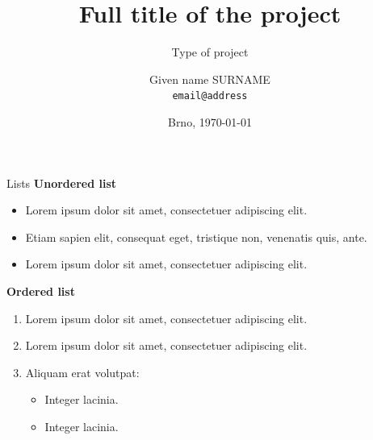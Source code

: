 \documentclass[aspectratio=1610]{beamer}
\title[Short title]
{Full title of the project}
\subtitle
{Type of project}
\author[Given name SURNAME]
{Given name SURNAME\\
\texttt{email@address}}
\institute
{Department of Radio Electronics\\
Brno University of Technology, Czechia}
\date[\today]
{Brno, \today}
\begin{document}

\begin{frame}
    \titlepage
\end{frame}

\begin{frame}{Lists}
    \textbf{Unordered list}
    \begin{itemize}
        \item Lorem ipsum dolor sit amet, consectetuer adipiscing elit.
        \item Etiam sapien elit, consequat eget, tristique non, venenatis quis, ante.
        \item Lorem ipsum dolor sit amet, consectetuer adipiscing elit.
    \end{itemize}
    \bigskip

    \textbf{Ordered list}
    \begin{enumerate}
        \item \alert{Lorem ipsum dolor} sit amet, consectetuer adipiscing elit.
        \item Lorem ipsum dolor sit amet, consectetuer adipiscing elit.
        \item Aliquam erat volutpat:
        \begin{itemize}
            \item Integer lacinia.
            \item Integer lacinia.
        \end{itemize}
    \end{enumerate}
\end{frame}

\end{document}
